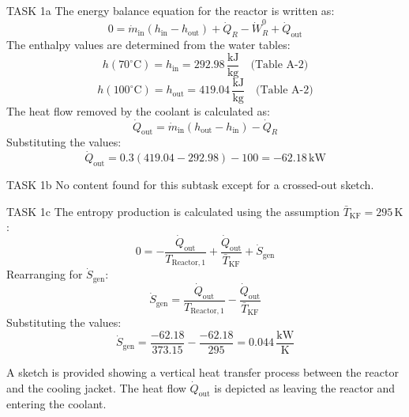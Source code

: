 TASK 1a  
The energy balance equation for the reactor is written as:  
\[
0 = \dot{m}_{\text{in}} \left( h_{\text{in}} - h_{\text{out}} \right) + \dot{Q}_R - \dot{W}_R^0 + \dot{Q}_{\text{out}}
\]  
The enthalpy values are determined from the water tables:  
\[
h(70^\circ\text{C}) = h_{\text{in}} = 292.98 \, \frac{\text{kJ}}{\text{kg}} \quad \text{(Table A-2)}
\]  
\[
h(100^\circ\text{C}) = h_{\text{out}} = 419.04 \, \frac{\text{kJ}}{\text{kg}} \quad \text{(Table A-2)}
\]  
The heat flow removed by the coolant is calculated as:  
\[
\dot{Q}_{\text{out}} = \dot{m}_{\text{in}} \left( h_{\text{out}} - h_{\text{in}} \right) - \dot{Q}_R
\]  
Substituting the values:  
\[
\dot{Q}_{\text{out}} = 0.3 \left( 419.04 - 292.98 \right) - 100 = -62.18 \, \text{kW}
\]  

TASK 1b  
No content found for this subtask except for a crossed-out sketch.  

TASK 1c  
The entropy production is calculated using the assumption \( \bar{T}_{\text{KF}} = 295 \, \text{K} \):  
\[
0 = -\frac{\dot{Q}_{\text{out}}}{T_{\text{Reactor},1}} + \frac{\dot{Q}_{\text{out}}}{\bar{T}_{\text{KF}}} + \dot{S}_{\text{gen}}
\]  
Rearranging for \( \dot{S}_{\text{gen}} \):  
\[
\dot{S}_{\text{gen}} = \frac{\dot{Q}_{\text{out}}}{T_{\text{Reactor},1}} - \frac{\dot{Q}_{\text{out}}}{\bar{T}_{\text{KF}}}
\]  
Substituting the values:  
\[
\dot{S}_{\text{gen}} = \frac{-62.18}{373.15} - \frac{-62.18}{295} = 0.044 \, \frac{\text{kW}}{\text{K}}
\]  

A sketch is provided showing a vertical heat transfer process between the reactor and the cooling jacket. The heat flow \( \dot{Q}_{\text{out}} \) is depicted as leaving the reactor and entering the coolant.